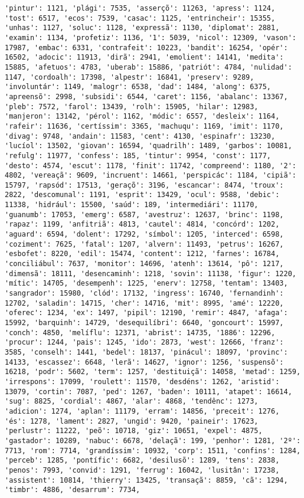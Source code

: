 \documentclass[11pt]{article}
\begin{document}
\begin{Verbatim}[commandchars=\\\{\}]
'pintur': 1121, 'plági': 7535, 'asserçõ': 11263, 'apress': 1124, 'tost': 6517, 'ecos': 7539, 'casac': 1125, 'entrincheir': 15355, 'unhas': 1127, 'soluc': 1128, 'expressã': 1130, 'diplomat': 2881, 'examin': 1134, 'profetiz': 1136, '1': 5039, 'nicol': 12309, 'vason': 17987, 'embac': 6331, 'contrafeit': 10223, 'bandit': 16254, 'opér': 16502, 'adocic': 11913, 'dirã': 2941, 'emolient': 14141, 'medita': 15885, 'afetuos': 4783, 'uberab': 15886, 'patriót': 4784, 'nulidad': 1147, 'cordoalh': 17398, 'alpestr': 16841, 'preserv': 9289, 'involuntár': 1149, 'malogr': 6538, 'dad': 1484, 'along': 6375, 'apreensõ': 2998, 'subsidi': 6544, 'caret': 1156, 'abalanc': 13367, 'pleb': 7572, 'farol': 13439, 'rolh': 15905, 'hilar': 12983, 'manjeron': 13142, 'pérol': 1162, 'módic': 6557, 'desleix': 1164, 'rafeir': 11636, 'certíssim': 3365, 'machuqu': 1169, 'imit': 1170, 'divag': 9748, 'andain': 11583, 'cent': 4130, 'espinafr': 13230, 'lucíol': 13502, 'giovan': 16594, 'quadrilh': 1489, 'garbos': 10081, 'refulg': 11977, 'confess': 185, 'tintur': 9954, 'const': 1177, 'desto': 4574, 'escut': 1178, 'finit': 11742, 'compreend': 1180, '2': 4802, 'vereaçã': 9609, 'incruent': 14661, 'perspicác': 1184, 'cipiã': 15797, 'rapsód': 17513, 'geraçõ': 3196, 'escancar': 8474, 'troux': 2822, 'descomunal': 1191, 'esprit': 13429, 'ocul': 9588, 'debic': 11338, 'hidrául': 15500, 'saúd': 189, 'intermediári': 11170, 'guanumb': 17053, 'emerg': 6587, 'avestruz': 12637, 'brinc': 1198, 'rapaz': 1199, 'anfitriã': 4813, 'cautel': 4814, 'concórd': 1202, 'aguard': 6594, 'dolent': 17292, 'símbol': 1205, 'interced': 6598, 'coziment': 7625, 'fatal': 1207, 'alvern': 11493, 'petrus': 16267, 'esbofet': 8220, 'edil': 15474, 'content': 1212, 'farnes': 16784, 'conciliábul': 7637, 'monitor': 14696, 'atenh': 13614, 'pô': 1217, 'dimensã': 18111, 'desencaminh': 1218, 'sovin': 11138, 'figur': 1220, 'mític': 14705, 'desempenh': 1225, 'enerv': 12758, 'tentam': 13403, 'sangrador': 15980, 'clód': 17132, 'ingress': 16740, 'fernandinh': 12702, 'saladin': 14715, 'cher': 14716, 'mit': 8995, 'amé': 12220, 'oferec': 1234, 'ex': 1497, 'pipil': 12190, 'remir': 4847, 'afaga': 15992, 'barquinh': 14729, 'desequilíbri': 6640, 'goncourt': 15997, 'conch': 4850, 'melíflu': 12371, 'abrist': 14735, '1886': 12296, 'procur': 1244, 'pais': 1245, 'ido': 2873, 'west': 12666, 'franz': 3585, 'conselh': 1441, 'bedel': 18137, 'pinácul': 18097, 'provinc': 14133, 'escassez': 6648, 'lerã': 14627, 'ignor': 1256, 'suspensõ': 16218, 'podr': 5602, 'term': 1257, 'destituiçã': 14058, 'metad': 1259, 'irrespons': 17099, 'roulett': 11570, 'desdéns': 1262, 'aristid': 13079, 'cortin': 7087, 'ped': 1267, 'baden': 10111, 'atapet': 16614, 'sug': 8825, 'cordial': 4867, 'alar': 4868, 'tendênc': 1273, 'adicion': 1274, 'aplan': 11179, 'erram': 14856, 'preceit': 1276, 'és': 1278, 'lament': 2827, 'ungid': 9420, 'paineir': 17623, 'perlustr': 11222, 'peõ': 10718, 'giz': 10651, 'expel': 4875, 'gastador': 10289, 'nabuc': 6678, 'delaçã': 199, 'penhor': 1281, '2º': 7713, 'rom': 7714, 'grandíssim': 10932, 'corp': 1511, 'confins': 1284, 'perceb': 1285, 'pontífic': 6682, 'desilusõ': 1289, 'tens': 2838, 'penos': 7993, 'convid': 1291, 'ferrug': 16042, 'lusitân': 17238, 'assistent': 10814, 'thierry': 13425, 'transaçã': 8859, 'cã': 1294, 'timbr': 4886, 'desarrum': 7734, 
\end{Verbatim}
\end{document}
